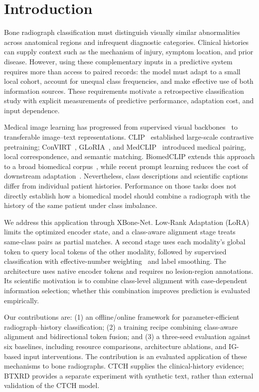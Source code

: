 \documentclass[conference,a4paper]{IEEEtran}
\begin{document}
\section{Introduction}
Bone radiograph classification must distinguish visually similar abnormalities across anatomical regions and infrequent diagnostic categories. Clinical histories can supply context such as the mechanism of injury, symptom location, and prior disease. However, using these complementary inputs in a predictive system requires more than access to paired records: the model must adapt to a small local cohort, account for unequal class frequencies, and make effective use of both information sources. These requirements motivate a retrospective classification study with explicit measurements of predictive performance, adaptation cost, and input dependence.

Medical image learning has progressed from supervised visual backbones~\cite{ResNet,DenseNet} to transferable image--text representations. CLIP~\cite{CLIP} established large-scale contrastive pretraining; ConVIRT~\cite{ConVIRT}, GLoRIA~\cite{GLoRIA}, and MedCLIP~\cite{MedCLIP} introduced medical pairing, local correspondence, and semantic matching. BiomedCLIP extends this approach to a broad biomedical corpus~\cite{BiomedCLIP}, while recent prompt learning reduces the cost of downstream adaptation~\cite{BiomedCoOp}. Nevertheless, class descriptions and scientific captions differ from individual patient histories. Performance on those tasks does not directly establish how a biomedical model should combine a radiograph with the history of the same patient under class imbalance.

We address this application through XBone-Net. Low-Rank Adaptation (LoRA)~\cite{Hu2022LoRA} limits the optimized encoder state, and a class-aware alignment stage treats same-class pairs as partial matches. A second stage uses each modality's global token to query local tokens of the other modality, followed by supervised classification with effective-number weighting~\cite{Cui2019ClassBalanced} and label smoothing. The architecture uses native encoder tokens and requires no lesion-region annotations. Its scientific motivation is to combine class-level alignment with case-dependent information selection; whether this combination improves prediction is evaluated empirically.

Our contributions are: (1) an offline/online framework for parameter-efficient radiograph--history classification; (2) a training recipe combining class-aware alignment and bidirectional token fusion; and (3) a three-seed evaluation against six baselines, including resource comparisons, architecture ablations, and IG-based input interventions. The contribution is an evaluated application of these mechanisms to bone radiographs. CTCH supplies the clinical-history evidence; BTXRD provides a separate experiment with synthetic text, rather than external validation of the CTCH model.
\end{document}
